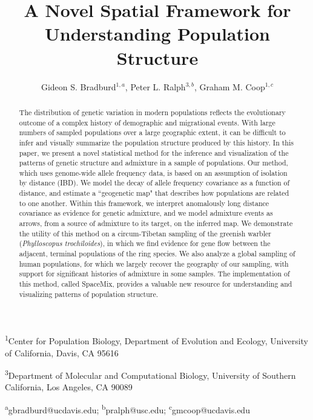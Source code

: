 \documentclass[12pt]{article}
\title{A Novel Spatial Framework for Understanding Population Structure}
\date{\vspace{-5ex}}
\author{Gideon S. Bradburd$^{1,a}$, Peter L. Ralph$^{3,b}$, Graham M. Coop$^{1,c}$}
\begin{document}
\maketitle

\textsuperscript{1}Center for Population Biology, Department of Evolution and Ecology, University of California, Davis, CA 95616

\textsuperscript{3}Department of Molecular and Computational Biology, University of Southern California, Los Angeles, CA 90089

\textsuperscript{a}gbradburd@ucdavis.edu; 
\textsuperscript{b}pralph@usc.edu;
\textsuperscript{c}gmcoop@ucdavis.edu\\\\\

\newpage

\begin{abstract}
The distribution of genetic variation in modern populations reflects the evolutionary outcome of a complex history of demographic and migrational events.  With large numbers of sampled populations over a large geographic extent, it can be difficult to infer and visually summarize the population structure produced by this history.  In this paper, we present a novel statistical method for the inference and visualization of the patterns of genetic structure and admixture in a sample of populations.  Our method, which uses genome-wide allele frequency data, is based on an assumption of isolation by distance (IBD).  We model the decay of allele frequency covariance as a function of distance, and estimate a ``geogenetic map" that describes how populations are related to one another.  Within this framework, 
we interpret anomalously long distance covariance as evidence for genetic admixture, and we model admixture events as arrows, from a source of admixture to its target, on the inferred map.  We demonstrate the utility of this method on a circum-Tibetan sampling of the greenish warbler (\textit{Phylloscopus trochiloides}), in which we find evidence for gene flow between the adjacent, terminal populations of the ring species.  We also analyze a global sampling of human populations, for which we largely recover the geography of our sampling, with support for significant histories of admixture in some samples.  The implementation of this method, called SpaceMix, provides a valuable new resource for understanding and visualizing patterns of population structure.
\end{abstract}
\end{document}
